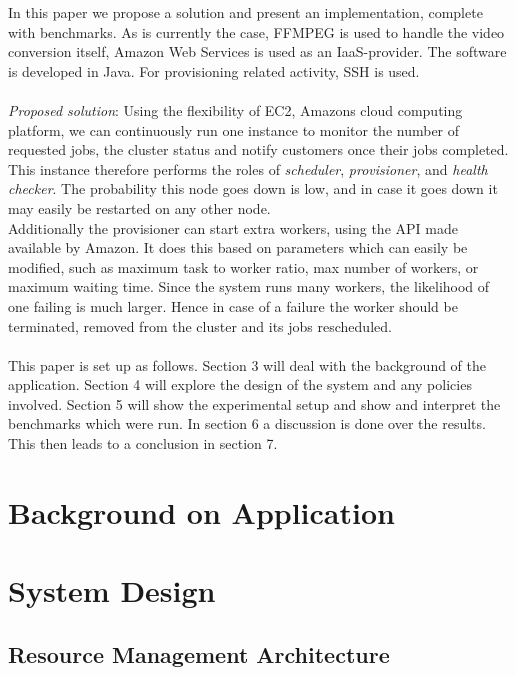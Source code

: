 \documentclass[a4paper]{IEEEtran}
\begin{document}
In this paper we propose a solution and present an implementation, complete with benchmarks.
As is currently the case, FFMPEG is used to handle the video conversion itself, Amazon Web Services is used as an IaaS-provider.
The software is developed in Java. For provisioning related activity, SSH is used.
\\
\\
\textit{Proposed solution}: Using the flexibility of EC2, Amazons cloud computing platform, we can continuously run one instance to monitor the number of requested jobs, the cluster status and notify customers once their jobs completed.
This instance therefore performs the roles of \textit{scheduler}, \textit{provisioner}, and \textit{health checker}.
The probability this node goes down is low, and in case it goes down it may easily be restarted on any other node.
\\
Additionally the provisioner can start extra workers, using the API made available by Amazon.
It does this based on parameters which can easily be modified, such as maximum task to worker ratio, max number of workers, or maximum waiting time.
Since the system runs many workers, the likelihood of one failing is much larger. 
Hence in case of a failure the worker should be terminated, removed from the cluster and its jobs rescheduled.
\\
\\
This paper is set up as follows.
Section 3 will deal with the background of the application.
Section 4 will explore the design of the system and any policies involved. 
Section 5 will show the experimental setup and show and interpret the benchmarks which were run.
In section 6 a discussion is done over the results.
This then leads to a conclusion in section 7.

\section{Background on Application}

\section{System Design}

\subsection{Resource Management Architecture}

\end{document}
